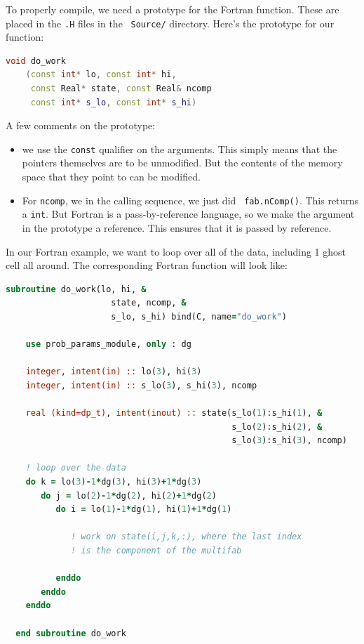 To properly compile, we need a prototype for the Fortran
function.  These are placed in the {\tt .H} files in the
\castro\ {\tt Source/} directory.  Here's the prototype for
our function:

\begin{lstlisting}[language=C++]
  void do_work
    (const int* lo, const int* hi,
     const Real* state, const Real& ncomp
     const int* s_lo, const int* s_hi)
\end{lstlisting}

A few comments on the prototype:
\begin{itemize}
\item we use the {\tt const} qualifier on the arguments.  This simply
  means that the pointers themselves are to be unmodified.  But the
  contents of the memory space that they point to can be modified.

\item For {\tt ncomp}, we in the calling sequence, we just did {\tt
  fab.nComp()}.  This returns a {\tt int}.  But Fortran is a
  pass-by-reference language, so we make the argument in the prototype
  a reference.  This ensures that it is passed by reference.
\end{itemize}

In our Fortran example, we want to loop over all of the data,
including 1 ghost cell all around.  The corresponding Fortran function
will look like:
\begin{lstlisting}[language=Fortran]
  subroutine do_work(lo, hi, &
                     state, ncomp, &
                     s_lo, s_hi) bind(C, name="do_work")

    use prob_params_module, only : dg

    integer, intent(in) :: lo(3), hi(3)
    integer, intent(in) :: s_lo(3), s_hi(3), ncomp

    real (kind=dp_t), intent(inout) :: state(s_lo(1):s_hi(1), &
                                             s_lo(2):s_hi(2), &
                                             s_lo(3):s_hi(3), ncomp)

    ! loop over the data
    do k = lo(3)-1*dg(3), hi(3)+1*dg(3)
       do j = lo(2)-1*dg(2), hi(2)+1*dg(2)
          do i = lo(1)-1*dg(1), hi(1)+1*dg(1)

             ! work on state(i,j,k,:), where the last index
             ! is the component of the multifab

          enddo
       enddo
    enddo

  end subroutine do_work
\end{lstlisting}

